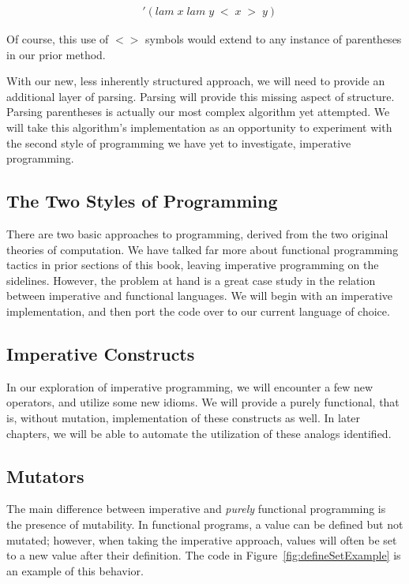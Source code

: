 \begin{figure}[htp]
\footnotesize
\caption{}\label{fig:flatInputExample}
\begin{align*}
& '(lam \; x \; lam \; y \; < \; x \; > \; y)
\end{align*}
\end{figure}

Of course, this use of $<>$ symbols would extend to any instance of parentheses 
in our prior method.

With our new, less inherently structured approach, we will need to provide an 
additional layer of parsing. Parsing will provide this missing aspect of structure. 
Parsing parentheses is actually our most complex algorithm yet attempted. We will 
take this algorithm's implementation as an opportunity to experiment with the 
second style of programming we have yet to investigate, imperative programming.

\subsection{The Two Styles of Programming}
There are two basic approaches to programming, derived from the two original 
theories of computation. We have talked far more about functional programming 
tactics in prior sections of this book, leaving imperative programming on the 
sidelines. However, the problem at hand is a great case study in the relation 
between imperative and functional languages. We will begin with an imperative 
implementation, and then port the code over to our current language of choice.

\subsection{Imperative Constructs}
In our exploration of imperative programming, we will encounter a few new operators, 
and utilize some new idioms. We will provide a purely functional, that is, without
mutation, implementation of these constructs as well. In later chapters, we will be
able to automate the utilization of these analogs identified.

\subsection{Mutators}
The main difference between imperative and \emph{purely} functional programming is
the presence of mutability. In functional programs, a value can be defined but
not mutated; however, when taking the imperative approach, values will often be
set to a new value after their definition. The code in
Figure~\ref{fig:defineSetExample} is an example of this behavior.

